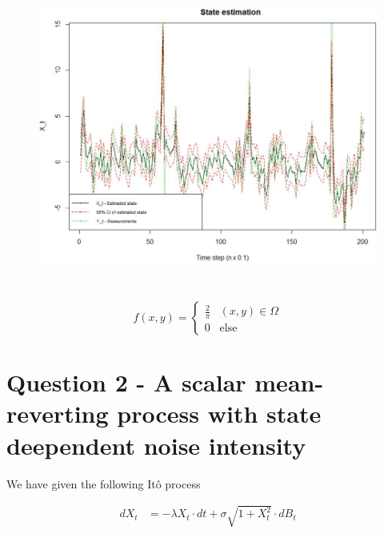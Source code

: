 \documentclass[a4paper,12pt]{article}
\begin{document}
\begin{equation*}
\begin{aligned}

\end{aligned}
\end{equation*}


\FloatBarrier
\begin{figure}[ht]
	\begin{center}
		\includegraphics[height=10cm]{state_est.JPG}
		\label{fig:23}
	\end{center}
\end{figure}
\FloatBarrier


\[f(x,y)= \begin{cases} 
      \frac{2}{\pi} & (x,y)\in \Omega \\
      0  &\textrm{else}
   \end{cases}
\]



\section{Question 2 - A scalar mean-reverting process with state deependent noise intensity}



We have given the following It\^{o} process

\begin{equation}
\begin{aligned}
\label{ex21}
dX_t&=-\lambda X_t\cdot dt + \sigma\sqrt{1+X_t^2}\cdot dB_t
\end{aligned}
\end{equation}
\end{document}
